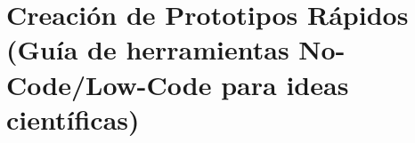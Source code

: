 
\section[Creación de Prototipos Rápidos]{Creación de Prototipos Rápidos (Guía de herramientas No-Code/Low-Code para ideas científicas)}

